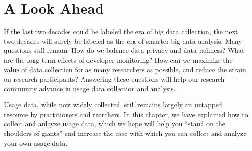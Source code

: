 %
%
%

\section{A Look Ahead}

If the last two decades could be labeled the era
of big data collection, 
the next two decades will surely be labeled as the 
era of smarter big data analysis.
Many questions still remain:
How do we balance data privacy and data richness?
What are the long term effects of developer monitoring?
How can we maximize the value of data collection
for as many researchers as possible, and reduce the 
strain on research participants?
Answering these questions will help our research
community advance in usage data collection and analysis.

Usage data, while now widely collected, still remains largely 
an untapped resource by practitioners and rearchers.
In this chapter, we have explained how to collect and 
anlayze usage data, which we hope will help you ``stand
on the shoulders of giants'' and increase the ease
with which you can collect and analyze your own usage data.
